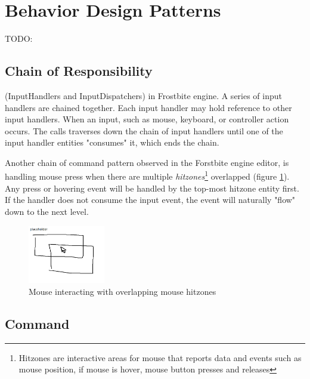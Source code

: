 \section{Behavior Design Patterns}

\iftwocolumns
\begin{multicols}{2}
\fi

TODO:

\subsection{Chain of Responsibility}

(InputHandlers and InputDispatchers) in Frostbite engine. A series of input handlers are chained together. Each input handler may hold reference to other input handlers.
\bs
When an input, such as mouse, keyboard, or controller action occurs. The calls traverses down the chain of input handlers until one of the input handler entities "consumes" it, which ends the chain.
\bs

Another chain of command pattern observed in the Forstbite engine editor, is handling mouse press when there are multiple \textit{hitzones}\footnote{Hitzones are interactive areas for mouse that reports data and events such as mouse position, if mouse is hover, mouse button presses and releases} overlapped (figure \ref{fig:chainofcommand-mousezones}). Any press or hovering event will be handled by the top-most hitzone entity first. If the handler does not consume the input event, the event will naturally "flow" down to the next level.
\bs

\begin{figure}[H]
	\centering
	\includegraphics[width=0.3\textwidth]{assets/chainofcommand_mousezones}
	\caption{Mouse interacting with overlapping mouse hitzones}
	\label{fig:chainofcommand-mousezones}
\end{figure}

\subsection{Command}


\end{multicols}
